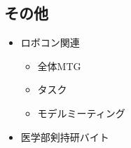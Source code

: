 \documentclass[uplatex, onecolumn, 10pt]{jsarticle}
\begin{document}
\subsection*{その他}
\begin{itemize}
	\item ロボコン関連
	\begin{itemize}
	    \item 全体MTG
	    \item タスク
	    \item モデルミーティング
    \end{itemize}
	\item 医学部剣持研バイト
\end{itemize}
\end{document}
